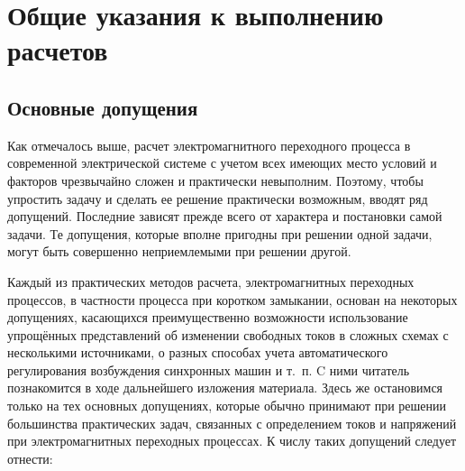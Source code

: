 \chapter{Общие указания к выполнению расчетов}
\label{chap:2 obshchie ukazaniia k vypolneniiu raschetov}

\section{Основные допущения}
\label{sec:2-1 osnovnye dopushcheniia}

Как отмечалось выше, расчет электромагнитного переходного процесса в современной электрической системе с учетом всех имеющих место условий и факторов чрезвычайно сложен и практически невыполним. Поэтому, чтобы упростить задачу и сделать ее решение практически возможным, вводят ряд допущений. Последние зависят прежде всего от характера и постановки самой задачи. Те допущения, которые вполне пригодны при решении одной задачи, могут быть совершенно неприемлемыми при решении другой.

Каждый из практических методов расчета, электромагнитных переходных процессов, в частности процесса при коротком замыкании, основан на некоторых допущениях, касающихся преимущественно возможности использование упрощённых представлений об изменении свободных токов в сложных схемах с несколькими источниками, о разных способах учета автоматического регулирования возбуждения синхронных машин и т.~п. C ними читатель познакомится в ходе дальнейшего изложения материала. Здесь же остановимся только на тех основных допущениях, которые обычно принимают при решении большинства практических задач, связанных с определением токов и напряжений при электромагнитных переходных процессах. К  числу таких допущений следует отнести:

